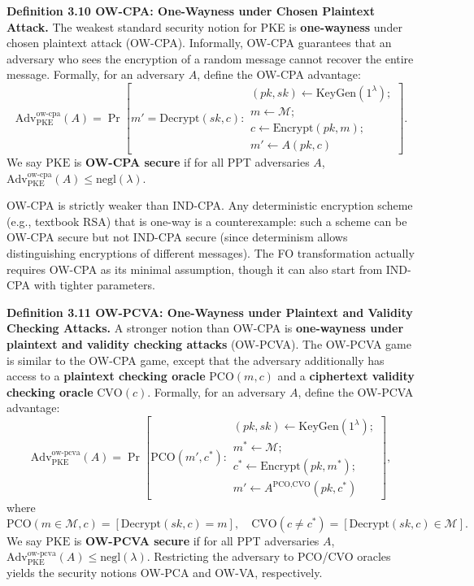 \noindent\textbf{Definition 3.10 OW-CPA: One-Wayness under Chosen Plaintext Attack.} The weakest standard security notion for PKE is \textbf{one-wayness} under chosen plaintext attack (OW-CPA). Informally, OW-CPA guarantees that an adversary who sees the encryption of a random message cannot recover the entire message. Formally, for an adversary $A$, define the OW-CPA advantage:
$$
\text{Adv}_{\text{PKE}}^{\text{ow-cpa}}(A) = \Pr\left[
m'=\text{Decrypt}(sk,c) : \begin{array}{c}
(pk, sk) \gets \text{KeyGen}(1^\lambda); \\
m \gets \mathcal{M}; \\
c \gets \text{Encrypt}(pk, m); \\
m' \gets A(pk, c)
\end{array}
\right].
$$
We say $\text{PKE}$ is \textbf{OW-CPA secure} if for all PPT adversaries $A$, $\text{Adv}_{\text{PKE}}^{\text{ow-cpa}}(A) \le \text{negl}(\lambda)$.

OW-CPA is strictly weaker than IND-CPA. Any deterministic encryption scheme (e.g., textbook RSA) that is one-way is a counterexample: such a scheme can be OW-CPA secure but not IND-CPA secure (since determinism allows distinguishing encryptions of different messages). The FO transformation actually requires OW-CPA as its minimal assumption, though it can also start from IND-CPA with tighter parameters.

\noindent\textbf{Definition 3.11 OW-PCVA: One-Wayness under Plaintext and Validity Checking Attacks.} A stronger notion than OW-CPA is \textbf{one-wayness under plaintext and validity checking attacks} (OW-PCVA). The OW-PCVA game is similar to the OW-CPA game, except that the adversary additionally has access to a \textbf{plaintext checking oracle} $\text{PCO}(m, c)$ and a \textbf{ciphertext validity checking oracle} $\text{CVO}(c)$. Formally, for an adversary $A$, define the OW-PCVA advantage:
$$
\text{Adv}_{\text{PKE}}^{\text{ow-pcva}}(A) = \Pr\left[
\text{PCO}(m', c^*):\begin{array}{c}
(pk, sk) \gets \text{KeyGen}(1^\lambda); \\
m^* \gets \mathcal{M}; \\
c^* \gets \text{Encrypt}(pk, m^*); \\
m' \gets A^\text{PCO,CVO}(pk, c^*)
\end{array}
\right],
$$
where
$$
\text{PCO}(m\in\mathcal{M}, c)=[\text{Decrypt}(sk, c)=m], \quad \text{CVO}(c\ne c^*)=[\text{Decrypt}(sk, c)\in\mathcal{M}].
$$
We say $\text{PKE}$ is \textbf{OW-PCVA secure} if for all PPT adversaries $A$, $\text{Adv}_{\text{PKE}}^{\text{ow-pcva}}(A) \le \text{negl}(\lambda)$.
Restricting the adversary to PCO/CVO oracles yields the security notions OW-PCA and OW-VA, respectively.

